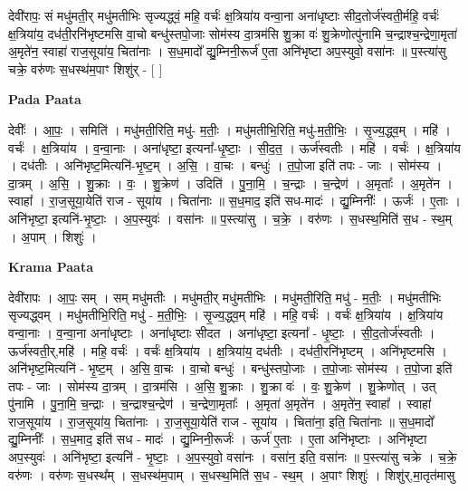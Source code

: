 \documentclass[17pt]{extarticle}
\begin{document}
देवी॑रापः॒ सं मधु॑मती॒र् मधु॑मतीभिः सृज्यद्ध्वं॒ महि॒ वर्चः॑ क्ष॒त्रिया॑य वन्वा॒ना अना॑धृष्टाः सीद॒तोर्ज॑स्वती॒र्महि॒ वर्चः॑ क्ष॒त्रिया॑य॒ दध॑ती॒रनि॑भृष्टमसि वा॒चो बन्धु॑स्तपो॒जाः सोम॑स्य दा॒त्रम॑सि शु॒क्रा वः॑ शु॒क्रेणोत्पु॑नामि च॒न्द्राश्च॒न्द्रेणा॒मृता॑ अ॒मृते॑न॒ स्वाहा॑ राज॒सूया॑य॒ चिता॑नाः । स॒ध॒मादो᳚ द्यु॒म्निनी॒रूर्ज॑ ए॒ता अनि॑भृष्टा अप॒स्युवो॒ वसा॑नः ॥ प॒स्त्या॑सु चक्रे॒ वरु॑णः स॒धस्थ॑म॒पाꣳ शिशु॑र् - [ ] \newline

\textbf{Pada Paata} \newline

देवीः᳚ । आ॒पः॒ । समिति॑ । मधु॑मती॒रिति॒ मधु॑- म॒तीः॒ । मधु॑मतीभि॒रिति॒ मधु॑-म॒ती॒भिः॒ । सृ॒ज्य॒द्ध्व॒म् । महि॑ । वर्चः॑ । क्ष॒त्रिया॑य । व॒न्वा॒नाः । अना॑धृष्टा॒ इत्यना᳚-धृ॒ष्टाः॒ । सी॒द॒त॒ । ऊर्ज॑स्वतीः । महि॑ । वर्चः॑ । क्ष॒त्रिया॑य । दध॑तीः । अनि॑भृष्ट॒मित्यनि॑-भृ॒ष्ट॒म् । अ॒सि॒ । वा॒चः । बन्धुः॑ । त॒पो॒जा इति॑ तपः - जाः । सोम॑स्य । दा॒त्रम् । अ॒सि॒ । शु॒क्राः । वः॒ । शु॒क्रेण॑ । उदिति॑ । पु॒ना॒मि॒ । च॒न्द्राः । च॒न्द्रेण॑ । अ॒मृताः᳚ । अ॒मृते॑न । स्वाहा᳚ । रा॒ज॒सूया॒येति॑ राज - सूया॑य । चिता॑नाः ॥ स॒ध॒माद॒ इति॑ सध-मादः॑ । द्यु॒म्निनीः᳚ । ऊर्जः॑ । ए॒ताः । अनि॑भृष्टा॒ इत्यनि॑-भृ॒ष्टाः॒ । अ॒प॒स्युवः॑ । वसा॑नः ॥ प॒स्त्या॑सु । च॒क्रे॒ । वरु॑णः । स॒धस्थ॒मिति॑ स॒ध - स्थ॒म् । अ॒पाम् । शिशुः॑ ।  \newline


\textbf{Krama Paata} \newline

देवी॑रापः । आ॒पः॒ सम् । सम् मधु॑मतीः । मधु॑मती॒र् मधु॑मतीभिः । मधु॑मती॒रिति॒ मधु॑ - म॒तीः॒ । मधु॑मतीभिः सृज्यद्ध्वम् । मधु॑मतीभि॒रिति॒ मधु॑ - म॒ती॒भिः॒ । सृ॒ज्य॒द्ध्व॒म् महि॑ । महि॒ वर्चः॑ । वर्चः॑ क्ष॒त्रिया॑य । क्ष॒त्रिया॑य वन्वा॒नाः । व॒न्वा॒ना अना॑धृष्टाः । अना॑धृष्टाः सीदत । अना॑धृष्टा॒ इत्यना᳚ - धृ॒ष्टाः॒ । सी॒द॒तोर्ज॑स्वतीः । ऊर्ज॑स्वती॒र्,महि॑ । महि॒ वर्चः॑ । वर्चः॑ क्ष॒त्रिया॑य । क्ष॒त्रिया॑य॒ दध॑तीः । दध॑ती॒रनि॑भृष्टम् । अनि॑भृष्टमसि । अनि॑भृष्ट॒मित्यनि॑ - भृ॒ष्ट॒म् । अ॒सि॒ वा॒चः । वा॒चो बन्धुः॑ । बन्धु॑स्तपो॒जाः । त॒पो॒जाः सोम॑स्य । त॒पो॒जा इति॑ तपः - जाः । सोम॑स्य दा॒त्रम् । दा॒त्रम॑सि । अ॒सि॒ शु॒क्राः । शु॒क्रा वः॑ । वः॒ शु॒क्रेण॑ । शु॒क्रेणोत् । उत् पु॑नामि । पु॒ना॒मि॒ च॒न्द्राः । च॒न्द्राश्च॒न्द्रेण॑ । च॒न्द्रेणा॒मृताः᳚ । अ॒मृता॑ अ॒मृते॑न । अ॒मृते॑न॒ स्वाहा᳚ । स्वाहा॑ राज॒सूया॑य । रा॒ज॒सूया॑य॒ चिता॑नाः । रा॒ज॒सूया॒येति॑ राज - सूया॑य । चिता॑ना॒ इति॒ चिता॑नाः ॥ स॒ध॒मादो᳚ द्यु॒म्निनीः᳚ । स॒ध॒माद॒ इति॑ सध - मादः॑ । द्यु॒म्निनी॒रूर्जः॑ । ऊर्ज॑ ए॒ताः । ए॒ता अनि॑भृष्टाः । अनि॑भृष्टा अप॒स्युवः॑ । अनि॑भृष्टा॒ इत्यनि॑ - भृ॒ष्टाः॒ । अ॒प॒स्युवो॒ वसा॑नः । वसा॑न॒ इति॒ वसा॑नः ॥ प॒स्त्या॑सु चक्रे । च॒क्रे॒ वरु॑णः । वरु॑णः स॒धस्थ᳚म् । स॒धस्थ॑म॒पाम् । स॒धस्थ॒मिति॑ स॒ध - स्थ॒म् । अ॒पाꣳ शिशुः॑ । शिशु॑र्,मा॒तृत॑मासु \newline
\end{document}
